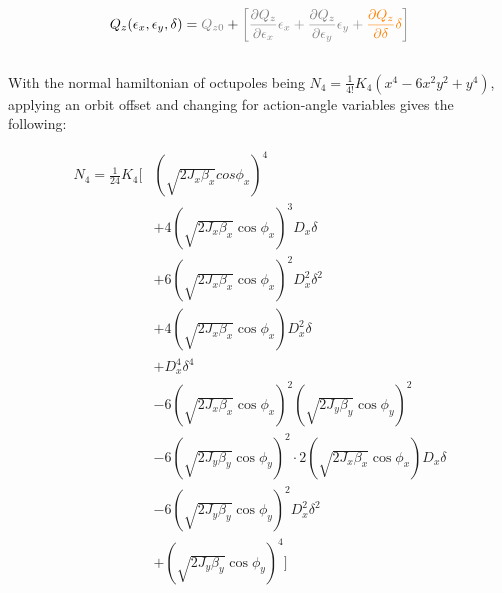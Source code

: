 \begin{equation}
\begin{aligned}
Q_z(\epsilon_x, \epsilon_y, \delta) = \color{gray}Q_{z0} &+ \color{gray}\left[\frac{\partial Q_z}{\partial \epsilon_x} \epsilon_x
                                                 + \frac{\partial Q_z}{\partial \epsilon_y} \epsilon_y
                                                 + \textcolor{orange}{\frac{\partial Q_z}{\partial \delta} \delta}
                                                \right] \\
\end{aligned}
\end{equation}



\subsection{}
\label{octupole-2}

With the normal hamiltonian of octupoles being
$N_4 = \frac{1}{4!}K_{4} \left(x^{4} - 6 x^{2} y^{2} + y^{4}\right)$, applying an orbit offset and
changing for action-angle variables gives the following:

\begin{equation}
\begin{aligned}
N_4 = \frac{1}{24} K_4 \biggl[& \left(\sqrt{2J_x\beta_x} cos\phi_x\right)^4 \\
                                        & +4 \left(\sqrt{2 J_x \beta_x} \cos \phi_x\right)^3 D_x \delta \\
                                        & +6 \left(\sqrt{2 J_x \beta_x} \cos \phi_x\right)^2 D_x^2 \delta^2 \\
                                        & +4 \left(\sqrt{2 J_x \beta_x} \cos \phi_x\right) D_x^2 \delta \\
                                        & +D_x^4 \delta^4 \\
                                        & -6 \left(\sqrt{2 J_x \beta_x} \cos \phi_x\right)^2 \left(\sqrt{2 J_y \beta_y}\cos \phi_y\right)^2\\
                                        & -6 \left(\sqrt{2 J_y \beta_y} \cos \phi_y\right)^2 \cdot 2 \left(\sqrt{2 J_x \beta_x}\cos \phi_x\right) D_x \delta \\
                                        & -6 \left(\sqrt{2 J_y \beta_y} \cos \phi_y\right)^2 D_x^2 \delta^2 \\
                                        & + \left(\sqrt{2 J_y \beta_y} \cos \phi_y\right)^4
                                  \biggr]\\
\end{aligned}
\end{equation}

